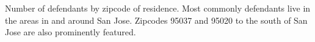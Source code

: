 Number of defendants by zipcode of residence. Most commonly defendants live in the areas in and around San Jose. Zipcodes 95037 and 95020 to the south of San Jose are also prominently featured.
\label{fig:map}